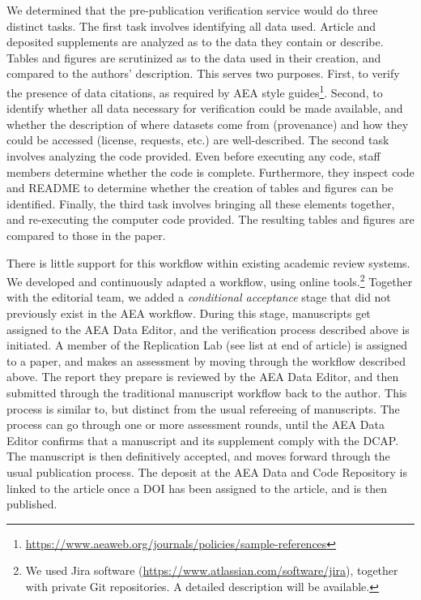 \documentclass[PP]{AEA}
\newcommand{\aeadcr}{AEA Data and Code Repository}
\newcommand{\urlcite}[2]{#2\footnote{\url{#1}}}
\newcommand{\furlcite}[2]{#2 (\url{#1})}
\begin{document}
We determined that the pre-publication verification service would do three distinct tasks. The first task involves identifying all data used.  Article and deposited supplements are analyzed as to the data they contain or describe. Tables and figures are scrutinized as to the data used in their creation, and compared to the authors' description. This serves two purposes. First, to verify the presence of data citations, as required by \urlcite{https://www.aeaweb.org/journals/policies/sample-references}{AEA style guides}. Second, to identify whether all data necessary for verification could be made available, and whether the description of where datasets come from (provenance) and how they could be accessed (license, requests, etc.) are well-described. The second task involves analyzing the code provided. Even before executing any code, staff members determine whether the code is complete. Furthermore, they inspect code and README to determine whether the creation of tables and figures can be identified. Finally, the third task  involves bringing all these elements together, and re-executing the computer code provided. The resulting tables and figures are compared to those in the paper. 

There is little support for this workflow within existing academic review systems. We developed and continuously adapted a workflow, using online tools.\footnote{We used \furlcite{https://www.atlassian.com/software/jira}{Jira software}, together with private Git repositories. A detailed description will be available.} Together with the editorial team, we added a \textit{conditional acceptance} stage that did not previously exist in the AEA workflow. During this stage, manuscripts get assigned to the AEA Data Editor, and the verification process described above is initiated. A member of the Replication Lab (see list at end of article) is assigned to a paper, and makes an assessment by moving through the workflow described above. The report they prepare is reviewed by the AEA Data Editor, and then submitted through the traditional manuscript workflow back to the author. This process is similar to, but distinct from the usual refereeing of manuscripts. The process can go through one or more assessment rounds, until the AEA Data Editor confirms that a manuscript and its supplement comply with the \ac{DCAP}. The manuscript is then definitively accepted, and moves forward through the usual publication process. The deposit at the \aeadcr{} is linked to the article once a \ac{DOI} has been assigned to the article, and is then published.
\end{document}
